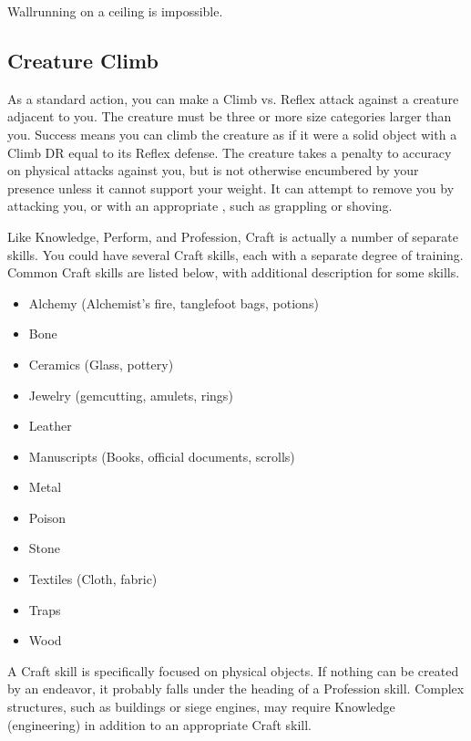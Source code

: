         Wallrunning on a ceiling is impossible.

    \subsection{Creature Climb}
        As a standard action, you can make a Climb vs. Reflex attack against a creature adjacent to you.
        The creature must be three or more size categories larger than you.
        Success means you can climb the creature as if it were a solid object with a Climb DR equal to its Reflex defense.
        The creature takes a  penalty to accuracy on physical attacks against you, but is not otherwise encumbered by your presence unless it cannot support your weight.
        It can attempt to remove you by attacking you, or with an appropriate , such as grappling or shoving.

\newpage
{}
        Like Knowledge, Perform, and Profession, Craft is actually a number of separate skills.
        You could have several Craft skills, each with a separate degree of training.
        Common Craft skills are listed below, with additional description for some skills.

        \begin{itemize}
            \item Alchemy (Alchemist's fire, tanglefoot bags, potions)
            \item Bone
            \item Ceramics (Glass, pottery)
            \item Jewelry (gemcutting, amulets, rings)
            \item Leather
            \item Manuscripts (Books, official documents, scrolls)
            \item Metal
            \item Poison
            \item Stone
            \item Textiles (Cloth, fabric)
            \item Traps
            \item Wood
        \end{itemize}


        A Craft skill is specifically focused on physical objects. If nothing can be created by an endeavor, it probably falls under the heading of a Profession skill. Complex structures, such as buildings or siege engines, may require Knowledge (engineering) in addition to an appropriate Craft skill.

